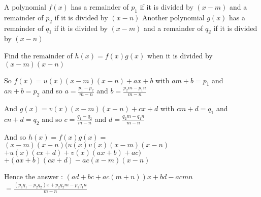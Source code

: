 \begin{solution}
	\begin{tcolorbox}A polynomial $f(x)$ has a remainder of $p_1$ if it is divided by $(x-m)$ and a remainder of $p_2$ if it is divided by $(x-n)$
Another polynomial $g(x)$ has a remainder of $q_1$ if it is divided by $(x-m)$ and a remainder of $q_2$ if it is divided by $(x-n)$

Find the remainder of $h(x) = f(x) g(x)$ when it is divided by $(x-m)(x-n)$\end{tcolorbox}
So $f(x)=u(x)(x-m)(x-n)+ax+b$ with $am+b=p_1$ and $an+b=p_2$ and so $a=\frac{p_1-p_2}{m-n}$ and $b=\frac{p_2m-p_1n}{m-n}$

And $g(x)=v(x)(x-m)(x-n)+cx+d$ with $cm+d=q_1$ and $cn+d=q_2$ and so $c=\frac{q_1-q_2}{m-n}$ and $d=\frac{q_2m-q_1n}{m-n}$

And so $h(x)=f(x)g(x)=$ $(x-m)(x-n)(u(x)v(x)(x-m)(x-n)$ $+u(x)(cx+d)+v(x)(ax+b)+ac)$ $+(ax+b)(cx+d)-ac(x-m)(x-n)$

Hence the answer : $(ad+bc+ac(m+n))x+bd-acmn$ $=\boxed{\frac{(p_1q_1-p_2q_2)x+p_2q_2m-p_1q_1n}{m-n}}$
\end{solution}



